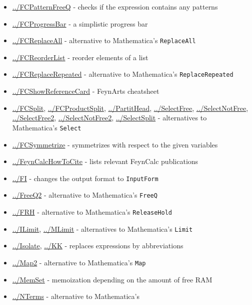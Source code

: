 \documentclass[../FeynCalcManual.tex]{subfiles}
\begin{document}
\begin{itemize}
\item
  \hyperlink{../fcpatternfreeq}{../FCPatternFreeQ} - checks if the
  expression contains any patterns
\item
  \hyperlink{../fcprogressbar}{../FCProgressBar} - a simplistic progress
  bar
\item
  \hyperlink{../fcreplaceall}{../FCReplaceAll} - alternative to
  Mathematica's \texttt{ReplaceAll}
\item
  \hyperlink{../fcreorderlist}{../FCReorderList} - reorder elements of a
  list
\item
  \hyperlink{../fcreplacerepeated}{../FCReplaceRepeated} - alternative
  to Mathematica's \texttt{ReplaceRepeated}
\item
  \hyperlink{../fcshowreferencecard}{../FCShowReferenceCard} - FeynArts
  cheatsheet
\item
  \hyperlink{../fcsplit}{../FCSplit},
  \hyperlink{../fcproductsplit}{../FCProductSplit},
  \hyperlink{../partithead}{../PartitHead},
  \hyperlink{../selectfree}{../SelectFree},
  \hyperlink{../selectnotfree}{../SelectNotFree},
  \hyperlink{../selectfree2}{../SelectFree2},
  \hyperlink{../selectnotfree2}{../SelectNotFree2},
  \hyperlink{../selectsplit}{../SelectSplit} - alternatives to
  Mathematica's \texttt{Select}
\item
  \hyperlink{../fcsymmetrize}{../FCSymmetrize} - symmetrizes with
  respect to the given variables
\item
  \hyperlink{../feyncalchowtocite}{../FeynCalcHowToCite} - lists
  relevant FeynCalc publications
\item
  \hyperlink{../fi}{../FI} - changes the output format to
  \texttt{InputForm}
\item
  \hyperlink{../freeq2}{../FreeQ2} - alternative to Mathematica's
  \texttt{FreeQ}
\item
  \hyperlink{../frh}{../FRH} - alternative to Mathematica's
  \texttt{ReleaseHold}
\item
  \hyperlink{../ilimit}{../ILimit}, \hyperlink{../mlimit}{../MLimit} -
  alternatives to Mathematica's \texttt{Limit}
\item
  \hyperlink{../isolate}{../Isolate}, \hyperlink{../kk}{../KK} -
  replaces expressions by abbreviations
\item
  \hyperlink{../map2}{../Map2} - alternative to Mathematica's
  \texttt{Map}
\item
  \hyperlink{../memset}{../MemSet} - memoization depending on the amount
  of free RAM
\item
  \hyperlink{../nterms}{../NTerms} - alternative to Mathematica's

\end{itemize}
\end{document}

